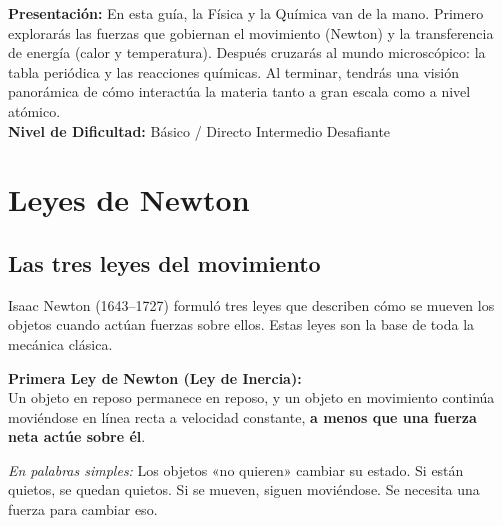 \documentclass[12pt, letterpaper]{article}
\begin{document}


\vspace{4pt}
\begin{cuadroinfo}
  \small
  \textbf{Presentación:} En esta guía, la Física y la Química van de la mano. Primero explorarás las fuerzas que gobiernan el movimiento (Newton) y la transferencia de energía (calor y temperatura). Después cruzarás al mundo microscópico: la tabla periódica y las reacciones químicas. Al terminar, tendrás una visión panorámica de cómo interactúa la materia tanto a gran escala como a nivel atómico.
  \\[4pt]
  \textbf{Nivel de Dificultad:}\quad
  \facil{} Básico / Directo \quad
  \medio{} Intermedio \quad
  \dificil{} Desafiante
\end{cuadroinfo}

\vspace{8pt}

\section{Leyes de Newton}

\subsection{Las tres leyes del movimiento}

Isaac Newton (1643--1727) formuló tres leyes que describen cómo se mueven los objetos cuando actúan fuerzas sobre ellos. Estas leyes son la base de toda la mecánica clásica.

\begin{cuadroteoria}
  \textbf{Primera Ley de Newton (Ley de Inercia):}\\
  Un objeto en reposo permanece en reposo, y un objeto en movimiento continúa moviéndose en línea recta a velocidad constante, \textbf{a menos que una fuerza neta actúe sobre él}.

  \textit{En palabras simples:} Los objetos «no quieren» cambiar su estado. Si están quietos, se quedan quietos. Si se mueven, siguen moviéndose. Se necesita una fuerza para cambiar eso.
\end{cuadroteoria}
\end{document}
